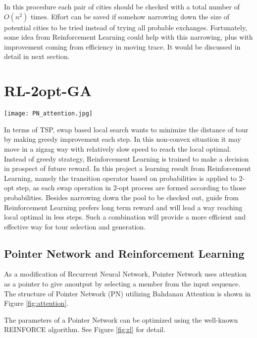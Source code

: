 \documentclass[twocolumn]{article}
\begin{document}
In this procedure each pair of cities should be checked with a total number of $O(n^2)$ times. Effort can be saved if somehow narrowing down the size of potential cities to be tried instead of trying all probable exchanges. Fortunately, some idea from Reinforcement Learning could help with this narrowing, plus with improvement coming from efficiency in moving trace. It would be discussed in detail in next section.

\section{RL-2opt-GA}

\begin{figure*}[h!t]
 \centering
\texttt{[image: PN\_attention.jpg]}
\caption{Pointer Network with Bahdanau Attention\cite{bahdanau2016end}}
\label{fig:attention}
\end{figure*}

In terms of TSP, swap based local search wants to minimize the distance of tour by making greedy improvement each step. In this non-convex situation it may move in a zigzag way with relatively slow speed to reach the local optimal. Instead of greedy strategy, Reinforcement Learning is trained to make a decision in prospect of future reward. In this project a learning result from Reinforcement Learning, namely the transition operator based on probabilities is applied to 2-opt step, as each swap operation in 2-opt process are formed according to those probabilities. Besides narrowing down the pool to be checked out, guide from Reinforcement Learning prefers long term reward and will lead a way reaching local optimal in less steps. Such a combination will provide a more efficient and effective way for tour selection and generation.

\subsection{Pointer Network and Reinforcement Learning}
As a modification of Recurrent Neural Network\cite{jaeger2002tutorial}, Pointer Network\cite{vinyals2015pointer} uses attention as a pointer to give anoutput by selecting a member from the input sequence. The structure of Pointer Network (PN) utilizing Bahdanau Attention is shown in Figure \ref{fig:attention}.

The parameters of a Pointer Network can be optimized using the well-known REINFORCE algorithm\cite{bello2016neural}. See Figure \ref{fig:rl} for detail.
\end{document}
